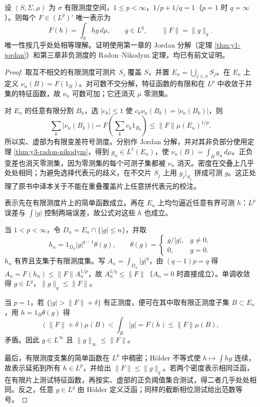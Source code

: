 \begin{theorem}\label{thm:y4-Lp-dual}
设 $(S,\Sigma,\mu)$ 为 $\sigma$ 有限测度空间，$1\le p<\infty$，$1/p+1/q=1$（$p=1$ 时 $q=\infty$）。则每个 $F\in(L^p)'$ 唯一表示为
\[
 F(h)=\int_Shg\,d\mu,\qquad g\in L^q,
 \qquad \|F\|=\|g\|_q.
\]
唯一性按几乎处处相等理解。证明使用第一章的 Jordan 分解（定理 \ref{thm:y1-jordan}）和第三章非负测度的 Radon--Nikodym 定理，均已有前文证明。
\end{theorem}
\begin{proof}
取互不相交的有限测度可测片 $S_j$ 覆盖 $S$，并置 $E_n=\bigcup_{j\le n}S_j$。在 $E_n$ 上定义 $\nu_n(B)=F(1_B)$。对可数不交分解，特征函数的有限和在 $L^p$ 中收敛于并集的特征函数，故 $\nu_n$ 可数可加；它还消灭 $\mu$ 零测集。

对 $E_n$ 的任意有限分割 $B_k$，选 $|c_k|\le1$ 使 $c_k\nu_n(B_k)=|\nu_n(B_k)|$，则
\[
 \sum_k|\nu_n(B_k)|
 =F\left(\sum_kc_k1_{B_k}\right)
 \le\|F\|\mu(E_n)^{1/p}.
\]
所以实、虚部为有限变差符号测度。分别作 Jordan 分解，并对其非负部分使用定理 \ref{thm:y3-radon-nikodym}，得到 $g_n\in L^1(E_n)$，使 $\nu_n(B)=\int_Bg_n\,d\mu$。正负变差也消灭零测集，因为零测集的每个可测子集都被 $\nu_n$ 消灭。密度在交叠上几乎处处相同；为避免选择代表元的歧义，在不交片 $S_j$ 上用 $g_j|_{S_j}$ 拼成可测 $g$。这正处理了原书中译本关于不能在重叠覆盖片上任意拼代表元的校注。

表示先在有限测度片上的简单函数成立。再在 $E_n$ 上均匀逼近任意有界可测 $h$：$L^p$ 误差与 $\int|g|$ 控制两端误差，故公式对这些 $h$ 也成立。

当 $1<p<\infty$，令 $D_n=E_n\cap\{|g|\le n\}$，并取
\[
 h_n=1_{D_n}|g|^{q-1}\theta(g),\qquad
 \theta(g)=\begin{cases}\overline g/|g|,&g\ne0,\\0,&g=0.\end{cases}
\]
$h_n$ 有界且支集于有限测度集。写 $A_n=\int_{D_n}|g|^q$，由 $(q-1)p=q$ 得
$A_n=F(h_n)\le\|F\|A_n^{1/p}$，故 $A_n^{1/q}\le\|F\|$（$A_n=0$ 时直接成立）。单调收敛得 $g\in L^q$，$\|g\|_q\le\|F\|$。

当 $p=1$，若 $\{|g|>\|F\|+\delta\}$ 有正测度，便可在其中取有限正测度子集 $B\subset E_n$，用 $h=1_B\theta(g)$ 得
\[
 (\|F\|+\delta)\mu(B)<\int_B|g|
 =F(h)\le\|F\|\mu(B),
\]
矛盾。因此 $g\in L^\infty$ 且 $\|g\|_\infty\le\|F\|$。

最后，有限测度支集的简单函数在 $L^p$ 中稠密；H\"older 不等式使 $h\mapsto\int hg$ 连续，故表示延拓到所有 $h\in L^p$，并给出 $\|F\|\le\|g\|_q$。若两个密度表示相同泛函，在有限片上测试特征函数，再按实、虚部的正负阈值集合测试，得二者几乎处处相同。反之，任意 $g\in L^q$ 由 H\"older 定义泛函；同样的截断相位测试给出范数等号。
\end{proof}

